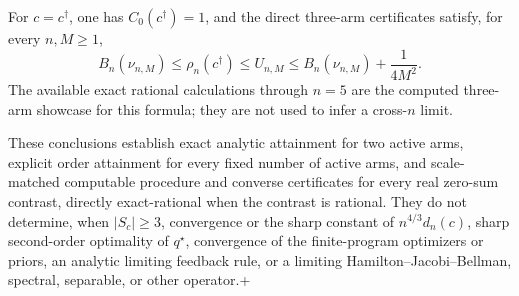 For \(c=c^\dagger\), one has \(C_0(c^\dagger)=1\), and the direct three-arm certificates satisfy, for every \(n,M\geq1\),
\[
 B_n(\nu_{n,M})\leq\rho_n(c^\dagger)\leq U_{n,M}
 \leq B_n(\nu_{n,M})+\frac1{4M^2}.
\]
The available exact rational calculations through \(n=5\) are the computed three-arm showcase for this formula; they are not used to infer a cross-\(n\) limit.

These conclusions establish exact analytic attainment for two active arms, explicit order attainment for every fixed number of active arms, and scale-matched computable procedure and converse certificates for every real zero-sum contrast, directly exact-rational when the contrast is rational.  They do not determine, when \(|S_c|\geq3\), convergence or the sharp constant of \(n^{4/3}d_n(c)\), sharp second-order optimality of \(q^\star\), convergence of the finite-program optimizers or priors, an analytic limiting feedback rule, or a limiting Hamilton--Jacobi--Bellman, spectral, separable, or other operator.+